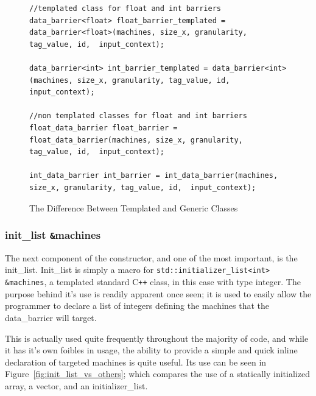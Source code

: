 \documentclass[../thesis.tex]{subfiles}
\begin{document}
    \begin{figure}[htbp]
      \centering

      \lstset{language=cpp}  
      \begin{lstlisting}[tabsize=2]
//templated class for float and int barriers
data_barrier<float> float_barrier_templated = data_barrier<float>(machines, size_x, granularity, tag_value, id,  input_context);

data_barrier<int> int_barrier_templated = data_barrier<int>(machines, size_x, granularity, tag_value, id,  input_context);

//non templated classes for float and int barriers
float_data_barrier float_barrier = float_data_barrier(machines, size_x, granularity, tag_value, id,  input_context);

int_data_barrier int_barrier = int_data_barrier(machines, size_x, granularity, tag_value, id,  input_context);
        \end{lstlisting}

      \caption{The Difference Between Templated and Generic Classes}
      \label{fig:templated_vs_non_templated}
    \end{figure}
  
  \subsubsection{init\_list \texttt{\&}machines} %
  \label{ssub:init_list}
    The next component of the constructor, and one of the most important, is the init\_list. Init\_list is simply a macro for \newline\texttt{std::initializer\_list<int> \&machines}, a templated standard C\texttt{++} class, in this case with type integer. The purpose behind it's use is readily apparent once seen; it is used to easily allow the programmer to declare a list of integers defining the machines that the data\_barrier will target.

    This is actually used quite frequently throughout the majority of code, and while it has it's own foibles in usage, the ability to provide a simple and quick inline declaration of targeted machines is quite useful. Its use can be seen in Figure~\ref{fig:init_list_vs_others}; which compares the use of a statically initialized array, a vector, and an initializer\_list.
\end{document}
